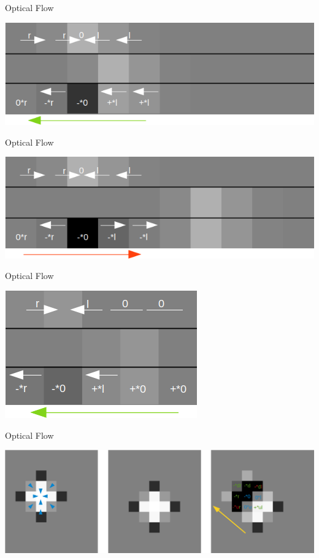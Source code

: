 \documentclass[aspectratio=169]{beamer}
\begin{document}
\begin{frame}{Optical Flow}
  \begin{center}
    \includegraphics[scale=0.6]{../img/optical_flow_intuitive_1.png}
  \end{center}
\end{frame}

\begin{frame}{Optical Flow}
  \begin{center}
    \includegraphics[scale=0.6]{../img/optical_flow_intuitive_2.png}
  \end{center}
\end{frame}

\begin{frame}{Optical Flow}
  \begin{center}
    \includegraphics[scale=0.6]{../img/optical_flow_intuitive_3.png}
  \end{center}
\end{frame}

\begin{frame}{Optical Flow}
  \begin{center}
    \includegraphics[scale=0.3]{../img/optical_flow_2d.png}
  \end{center}
\end{frame}
\end{document}
